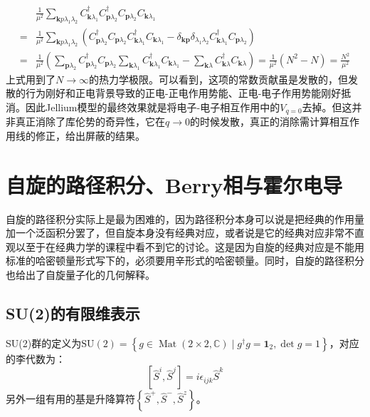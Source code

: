 \documentclass[10pt,openany]{book}
\theoremstyle{thmstyle} %
\theoremstyle{defstyle} %
\theoremstyle{prostyle} %
\begin{document}
\begin{equation}
	\begin{aligned}
		& \frac{1}{\mu^2} \sum_{\boldsymbol{k} p \lambda_1 \lambda_2} C_{\boldsymbol{k} \lambda_1}^{\dagger} C_{\boldsymbol{p} \lambda_2}^{\dagger} C_{\boldsymbol{p} \lambda_2} C_{\boldsymbol{k} \lambda_1} \\
		= & \frac{1}{\mu^2} \sum_{\boldsymbol{k} p \lambda_1 \lambda_2}\left(C_{\boldsymbol{p} \lambda_2}^{\dagger} C_{\boldsymbol{p} \lambda_2} C_{\boldsymbol{k} \lambda_1}^{\dagger} C_{\boldsymbol{k} \lambda_1}-\delta_{\boldsymbol{k p}} \delta_{\lambda_1 \lambda_2} C_{\boldsymbol{k} \lambda_1}^{\dagger} C_{\boldsymbol{p} \lambda_2}\right) \\
		= & \frac{1}{\mu^2}\left(\sum_{\boldsymbol{p} \lambda_2} C_{\boldsymbol{p} \lambda_2}^{\dagger} C_{\boldsymbol{p} \lambda_2} \sum_{\boldsymbol{k} \lambda_1} C_{\boldsymbol{k} \lambda_1}^{\dagger} C_{\boldsymbol{k} \lambda_1}-\sum_{\boldsymbol{k} \lambda} C_{\boldsymbol{k} \lambda}^{\dagger} C_{\boldsymbol{k} \lambda}\right)=\frac{1}{\mu^2}\left(N^2-N\right)=\frac{N^2}{\mu^2}
		\end{aligned}
\end{equation}
上式用到了$ N\to\infty $的热力学极限。可以看到，这项的常数贡献虽是发散的，但发散的行为刚好和正电背景导致的正电-正电作用势能、正电-电子作用势能刚好抵消。因此Jellium模型的最终效果就是将电子-电子相互作用中的$ V_{q=0} $去掉。但这并非真正消除了库伦势的奇异性，它在$ q\to0 $的时候发散，真正的消除需计算相互作用线的修正，给出屏蔽的结果。 
\section{自旋的路径积分、Berry相与霍尔电导}
自旋的路径积分实际上是最为困难的，因为路径积分本身可以说是把经典的作用量加一个泛函积分罢了，但自旋本身没有经典对应，或者说是它的经典对应非常不直观以至于在经典力学的课程中看不到它的讨论。这是因为自旋的经典对应是不能用标准的哈密顿量形式写下的，必须要用辛形式的哈密顿量。同时，自旋的路径积分也给出了自旋量子化的几何解释。
\subsection{SU(2)的有限维表示}
SU(2)群的定义为$ \mathrm{SU}(2)=\left\{g \in \operatorname{Mat}(2 \times 2, \mathbb{C}) \mid g^{\dagger} g=\mathbf{1}_2, \operatorname{det} g=1\right\} $，对应的李代数为：
\begin{equation}
	\left[\hat{S}^i, \hat{S}^j\right]=i \epsilon_{i j k} \hat{S}^k
\end{equation}
另外一组有用的基是升降算符$ \left\{\hat{S}^{+}, \hat{S}^{-}, \hat{S}^z\right\} $。\\
\end{document}

